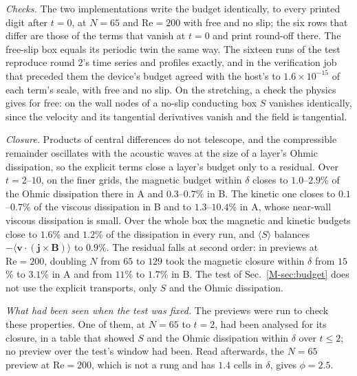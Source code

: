 \documentclass[aip,pop,reprint,amsmath,amssymb,superscriptaddress,floatfix]{revtex4-2}
\newcommand{\Rey}{\mathrm{Re}}
\newcommand{\vv}{\bm{v}}
\newcommand{\BB}{\bm{B}}
\begin{document}
\emph{Checks.} The two implementations write the budget identically, to every
printed digit after $t=0$, at $N=65$ and $\Rey=200$ with free and no slip; the six rows
that differ are those of the terms that vanish at $t=0$ and print round-off there. The
free-slip box equals its periodic twin the same way. The sixteen runs of the test
reproduce round 2's time series and profiles exactly, and in the verification job that
preceded them the device's budget agreed with the host's to $1.6\times10^{-15}$ of each
term's scale, with free and no slip. On the stretching, a check
the physics gives for free: on the wall nodes of a no-slip conducting box $S$
vanishes identically, since the velocity and its tangential derivatives vanish and
the field is tangential.

\emph{Closure.} Products of central differences do not telescope, and the
compressible remainder oscillates with the acoustic waves at the size of a layer's
Ohmic dissipation, so the explicit terms close a layer's budget only to a residual.
Over $t=2$--$10$, on the finer grids, the magnetic budget within $\delta$ closes to
$1.0$--$2.9$\% of the Ohmic dissipation there in A and $0.3$--$0.7$\% in B. The
kinetic one closes to $0.1$--$0.7$\% of the viscous dissipation in B and to
$1.3$--$10.4$\% in A, whose near-wall viscous dissipation is small. Over the whole box
the magnetic and kinetic budgets close to $1.6$\% and $1.2$\% of the dissipation in
every run, and $\langle S\rangle$ balances $-\langle\vv\cdot(\bm{j}\times\BB)\rangle$ to
$0.9$\%. The residual falls at second order: in previews at $\Rey=200$, doubling $N$
from $65$ to $129$ took the magnetic closure within $\delta$ from $15$\% to $3.1$\% in A
and from $11$\% to $1.7$\% in B. The test of Sec.~\ref{M-sec:budget} does not use the
explicit transports, only $S$ and the Ohmic dissipation.

\emph{What had been seen when the test was fixed.} The previews were run to check
these properties. One of them, at $N=65$ to $t=2$, had been analysed for its closure,
in a table that showed $S$ and the Ohmic dissipation within $\delta$ over $t\le2$; no
preview over the test's window had been. Read afterwards, the $N=65$ preview at
$\Rey=200$, which is not a rung and has $1.4$ cells in $\delta$, gives $\phi=2.5$.
\end{document}
